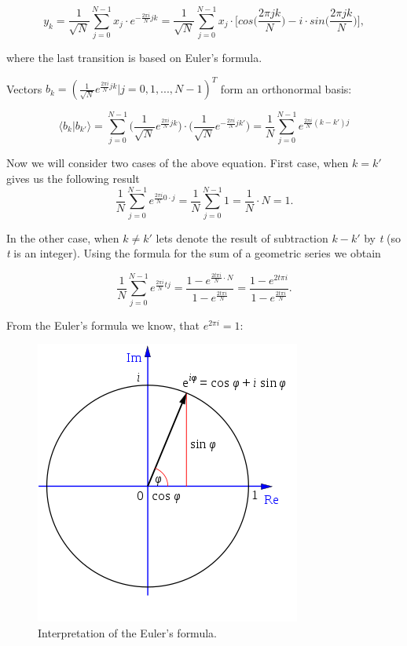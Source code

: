 \[ y_k = \frac{1}{\sqrt{N}}\sum_{j = 0}^{N - 1} x_j \cdot e^{-\frac{2 \pi i}{N}jk} = \frac{1}{\sqrt{N}}\sum_{j = 0}^{N - 1} x_j \cdot \bigg[cos\bigg(\frac{2 \pi jk}{N} \bigg) - i \cdot sin\bigg(\frac{2 \pi jk}{N}\bigg)\bigg],\]

where the last transition is based on Euler's formula.

\begin{remark}
Vectors $b_k = (\frac{1}{\sqrt{N}} e^{\frac{2 \pi i}{N} jk} | j = 0, 1, ..., N - 1)^T$ form an orthonormal basis:

\[ \langle b_k | b_{k'} \rangle = \sum_{j = 0}^{N - 1} \bigg(\frac{1}{\sqrt{N}} e^{\frac{2 \pi i}{N}jk}\bigg) \cdot \bigg(\frac{1}{\sqrt{N}} e^{-\frac{2 \pi i}{N}jk'}\bigg) =  \frac{1}{N} \sum_{j = 0}^{N - 1} e^{\frac{2 \pi i}{N} (k - k')j}\]

Now we will consider two cases of the above equation. First case, when $k = k'$ gives us the following result
\[ \frac{1}{N} \sum_{j = 0}^{N - 1} e^{\frac{2 \pi i}{N} 0 \cdot j} = \frac{1}{N} \sum_{j = 0}^{N - 1} 1 = \frac{1}{N} \cdot N = 1. \]

In the other case, when $k \neq k'$ lets denote the result of subtraction $k - k'$ by \textit{t} (so \textit{t} is an integer). Using the formula for the sum of a geometric series we obtain 

\[\frac{1}{N} \sum_{j = 0}^{N - 1} e^{\frac{2 \pi i}{N} t j} = \frac{1 - e^{\frac{2t \pi i}{N}\cdot N}}{1 - e^{\frac{2t \pi i}{N}}} = \frac{1 - e^{2t \pi i}}{1 - e^{\frac{2t \pi i}{N}}}.\]

From the Euler's formula we know, that $e^{2\pi i} = 1$:

\begin{figure}[ht]
\centering
\includegraphics[scale=0.4]{eulers_formula}
\caption{Interpretation of the Euler's formula.}
\end{figure}


\end{remark}
